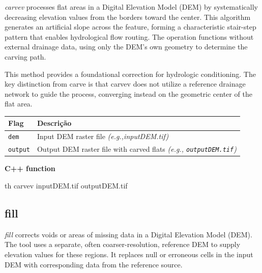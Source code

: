 \documentclass[
]{book}
\newenvironment{Shaded}{\begin{snugshade}}{\end{snugshade}}
\newcommand{\ExtensionTok}[1]{#1}
\newcommand{\NormalTok}[1]{#1}
\theoremstyle{definition}
\theoremstyle{definition}
\theoremstyle{definition}
\theoremstyle{definition}
\theoremstyle{remark}
\begin{document}
\emph{carvev} processes flat areas in a Digital Elevation Model (DEM) by systematically decreasing elevation values from the borders toward the center. This algorithm generates an artificial slope across the feature, forming a characteristic stair-step pattern that enables hydrological flow routing. The operation functions without external drainage data, using only the DEM's own geometry to determine the carving path.

This method provides a foundational correction for hydrologic conditioning. The key distinction from carve is that carvev does not utilize a reference drainage network to guide the process, converging instead on the geometric center of the flat area.

\begin{longtable}[]{@{}
  >{\raggedright\arraybackslash}p{}
  >{\raggedright\arraybackslash}p{}@{}}
\toprule\noalign{}
\begin{minipage}[b]{\linewidth}\raggedright
Flag
\end{minipage} & \begin{minipage}[b]{\linewidth}\raggedright
Descrição
\end{minipage} \\
\midrule\noalign{}
\endhead
\bottomrule\noalign{}
\endlastfoot
\texttt{dem} & Input DEM raster file \emph{(e.g.,inputDEM.tif)} \\
\texttt{output} & Output DEM raster file with carved flats \emph{(e.g., \texttt{outputDEM.tif})} \\
\end{longtable}

\textbf{C++ function}

\begin{Shaded}
\begin{Highlighting}[]
\ExtensionTok{th}\NormalTok{ carvev inputDEM.tif outputDEM.tif}
\end{Highlighting}
\end{Shaded}

\subsection{fill}\label{fill}

\emph{fill} corrects voids or areas of missing data in a Digital Elevation Model (DEM). The tool uses a separate, often coarser-resolution, reference DEM to supply elevation values for these regions. It replaces null or erroneous cells in the input DEM with corresponding data from the reference source.
\end{document}

